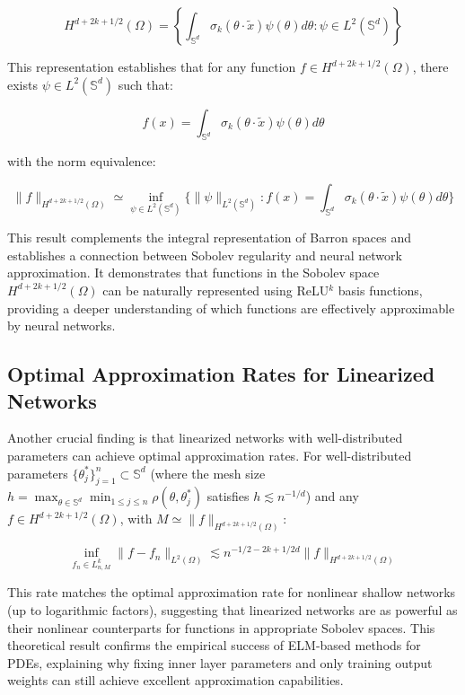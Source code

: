\documentclass[11pt]{article}
\begin{document}
\begin{equation}
H^{d+2k+1/2}(\Omega) = \left\{\int_{\mathbb{S}^d} \sigma_k(\theta \cdot \tilde{x}) \psi(\theta) d\theta : \psi \in L^2(\mathbb{S}^d) \right\}
\end{equation}

This representation establishes that for any function $f \in H^{d+2k+1/2}(\Omega)$, there exists $\psi \in L^2(\mathbb{S}^d)$ such that:

\begin{equation}
f(x) = \int_{\mathbb{S}^d} \sigma_k(\theta \cdot \tilde{x}) \psi(\theta) d\theta
\end{equation}

with the norm equivalence:

\begin{equation}
\|f\|_{H^{d+2k+1/2}(\Omega)} \simeq \inf_{\psi \in L^2(\mathbb{S}^d)} \{\|\psi\|_{L^2(\mathbb{S}^d)} : f(x) = \int_{\mathbb{S}^d} \sigma_k(\theta \cdot \tilde{x}) \psi(\theta) d\theta\}
\end{equation}

This result complements the integral representation of Barron spaces and establishes a connection between Sobolev regularity and neural network approximation. It demonstrates that functions in the Sobolev space $H^{d+2k+1/2}(\Omega)$ can be naturally represented using ReLU$^k$ basis functions, providing a deeper understanding of which functions are effectively approximable by neural networks.

\subsection{Optimal Approximation Rates for Linearized Networks}

Another crucial finding is that linearized networks with well-distributed parameters can achieve optimal approximation rates. For well-distributed parameters $\{\theta_j^*\}_{j=1}^n \subset \mathbb{S}^d$ (where the mesh size $h = \max_{\theta \in \mathbb{S}^d} \min_{1 \leq j \leq n} \rho(\theta, \theta_j^*)$ satisfies $h \lesssim n^{-1/d}$) and any $f \in H^{d+2k+1/2}(\Omega)$, with $M \simeq \|f\|_{H^{d+2k+1/2}(\Omega)}$:

\begin{equation}
\inf_{f_n \in L_{n,M}^k} \|f - f_n\|_{L^2(\Omega)} \lesssim n^{-1/2-2k+1/2d} \|f\|_{H^{d+2k+1/2}(\Omega)}
\end{equation}

This rate matches the optimal approximation rate for nonlinear shallow networks (up to logarithmic factors), suggesting that linearized networks are as powerful as their nonlinear counterparts for functions in appropriate Sobolev spaces. This theoretical result confirms the empirical success of ELM-based methods for PDEs, explaining why fixing inner layer parameters and only training output weights can still achieve excellent approximation capabilities.
\end{document}
